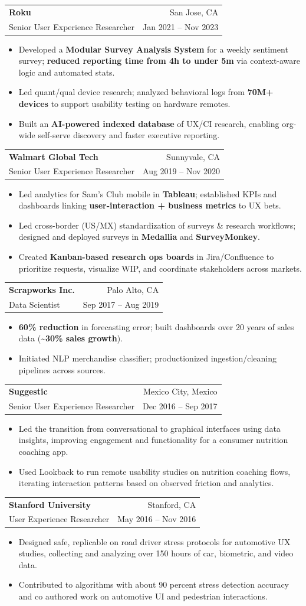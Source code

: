 \documentclass[letterpaper,10pt]{article}
\makeatletter
\newcommand{\resumeItem}[1]{
  \item\small{{#1 \vspace{-2pt}}}
}
\newcommand{\resumeSubheading}[4]{
  \vspace{-2pt}\item
    \begin{tabular*}{0.97\textwidth}[t]{l@{\extracolsep{\fill}}r}
      \textbf{#1} & \small #2 \\
      \small #3 & \small #4 \\
    \end{tabular*}\vspace{-7pt}
}
\newcommand{\resumeItemListStart}{\begin{itemize}}
\newcommand{\resumeItemListEnd}{\end{itemize}\vspace{-5pt}}
\makeatother
\begin{document}
    \resumeSubheading{Roku}{San Jose, CA}{Senior User Experience Researcher}{Jan 2021 -- Nov 2023}
    \resumeItemListStart
      \resumeItem{Developed a \textbf{Modular Survey Analysis System} for a weekly sentiment survey; \textbf{reduced reporting time from 4h to under 5m} via context-aware logic and automated stats.}
      \resumeItem{Led quant/qual device research; analyzed behavioral logs from \textbf{70M+ devices} to support usability testing on hardware remotes.}
      \resumeItem{Built an \textbf{AI-powered indexed database} of UX/CI research, enabling org-wide self-serve discovery and faster executive reporting.}
    \resumeItemListEnd

    \resumeSubheading{Walmart Global Tech}{Sunnyvale, CA}{Senior User Experience Researcher}{Aug 2019 -- Nov 2020}
    \resumeItemListStart
      \resumeItem{Led analytics for Sam’s Club mobile in \textbf{Tableau}; established KPIs and dashboards linking \textbf{user-interaction + business metrics} to UX bets.}
      \resumeItem{Led cross-border (US/MX) standardization of surveys \& research workflows; designed and deployed surveys in \textbf{Medallia} and \textbf{SurveyMonkey}.}
      \resumeItem{Created \textbf{Kanban-based research ops boards} in Jira/Confluence to prioritize requests, visualize WIP, and coordinate stakeholders across markets.}
    \resumeItemListEnd

    \resumeSubheading{Scrapworks Inc.}{Palo Alto, CA}{Data Scientist}{Sep 2017 -- Aug 2019}
    \resumeItemListStart
      \resumeItem{\textbf{60\% reduction} in forecasting error; built dashboards over 20 years of sales data (\textbf{\textasciitilde30\% sales growth}).}
      \resumeItem{Initiated NLP merchandise classifier; productionized ingestion/cleaning pipelines across sources.}
    \resumeItemListEnd

    \resumeSubheading{Suggestic}{Mexico City, Mexico}{Senior User Experience Researcher}{Dec 2016 -- Sep 2017}
    \resumeItemListStart
      \resumeItem{Led the transition from conversational to graphical interfaces using data insights, improving engagement and functionality for a consumer nutrition coaching app.}
      \resumeItem{Used Lookback to run remote usability studies on nutrition coaching flows, iterating interaction patterns based on observed friction and analytics.}
    \resumeItemListEnd

    \resumeSubheading{Stanford University}{Stanford, CA}{User Experience Researcher}{May 2016 -- Nov 2016}
    \resumeItemListStart
      \resumeItem{Designed safe, replicable on road driver stress protocols for automotive UX studies, collecting and analyzing over 150 hours of car, biometric, and video data.}
      \resumeItem{Contributed to algorithms with about 90 percent stress detection accuracy and co authored work on automotive UI and pedestrian interactions.}
    \resumeItemListEnd
\end{document}
